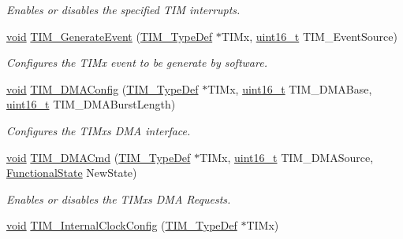 \begin{DoxyCompactItemize}
\begin{DoxyCompactList}\small\item\em Enables or disables the specified T\+IM interrupts. \end{DoxyCompactList}\item 
\hyperlink{usb__devapi_8h_afabf60e7f57651d6d595a02c75f07cd0}{void} \hyperlink{group___t_i_m___exported___functions_ga38bd4ffda920dd4f7655a0a2c6100a6e}{T\+I\+M\+\_\+\+Generate\+Event} (\hyperlink{struct_t_i_m___type_def}{T\+I\+M\+\_\+\+Type\+Def} $\ast$T\+I\+Mx, \hyperlink{_p_e___types_8h_a1f1825b69244eb3ad2c7165ddc99c956}{uint16\+\_\+t} T\+I\+M\+\_\+\+Event\+Source)
\begin{DoxyCompactList}\small\item\em Configures the T\+I\+Mx event to be generate by software. \end{DoxyCompactList}\item 
\hyperlink{usb__devapi_8h_afabf60e7f57651d6d595a02c75f07cd0}{void} \hyperlink{group___t_i_m___exported___functions_gad7156f84c436c8ac92cd789611826d09}{T\+I\+M\+\_\+\+D\+M\+A\+Config} (\hyperlink{struct_t_i_m___type_def}{T\+I\+M\+\_\+\+Type\+Def} $\ast$T\+I\+Mx, \hyperlink{_p_e___types_8h_a1f1825b69244eb3ad2c7165ddc99c956}{uint16\+\_\+t} T\+I\+M\+\_\+\+D\+M\+A\+Base, \hyperlink{_p_e___types_8h_a1f1825b69244eb3ad2c7165ddc99c956}{uint16\+\_\+t} T\+I\+M\+\_\+\+D\+M\+A\+Burst\+Length)
\begin{DoxyCompactList}\small\item\em Configures the T\+I\+Mx\textquotesingle{}s D\+MA interface. \end{DoxyCompactList}\item 
\hyperlink{usb__devapi_8h_afabf60e7f57651d6d595a02c75f07cd0}{void} \hyperlink{group___t_i_m___exported___functions_ga24700389cfa3ea9b42234933b23f1399}{T\+I\+M\+\_\+\+D\+M\+A\+Cmd} (\hyperlink{struct_t_i_m___type_def}{T\+I\+M\+\_\+\+Type\+Def} $\ast$T\+I\+Mx, \hyperlink{_p_e___types_8h_a1f1825b69244eb3ad2c7165ddc99c956}{uint16\+\_\+t} T\+I\+M\+\_\+\+D\+M\+A\+Source, \hyperlink{agilefox_2library_2inc_2stm32f10x__type_8h_ac9a7e9a35d2513ec15c3b537aaa4fba1}{Functional\+State} New\+State)
\begin{DoxyCompactList}\small\item\em Enables or disables the T\+I\+Mx\textquotesingle{}s D\+MA Requests. \end{DoxyCompactList}\item 
\hyperlink{usb__devapi_8h_afabf60e7f57651d6d595a02c75f07cd0}{void} \hyperlink{group___t_i_m___exported___functions_ga2394f0221709c0659874f9a4184cf86e}{T\+I\+M\+\_\+\+Internal\+Clock\+Config} (\hyperlink{struct_t_i_m___type_def}{T\+I\+M\+\_\+\+Type\+Def} $\ast$T\+I\+Mx)

\end{DoxyCompactItemize}
